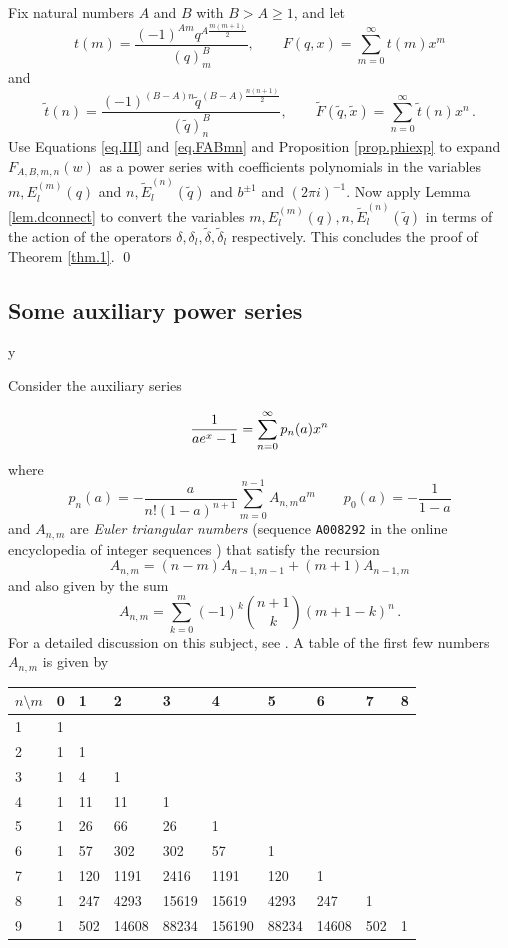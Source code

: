 \documentclass[12pt]{amsart}
\theoremstyle{definition}
\def\printname#1{
        \if\draft y
                \smash{\makebox[0pt]{\hspace{-0.5in}
                        \raisebox{8pt}{\tt\tiny #1}}}
        \fi
}
\def\lbl#1{\label{#1}\printname{#1}}
\def\ti{\widetilde}
\def\tq{\tilde{q}}
\def\d{\delta}
\begin{document}
Fix natural numbers $A$ and $B$ with $B > A \geq 1$, and  
let
$$
t(m)=\frac{(-1)^{A m} q^{A \frac{m(m+1)}{2}}}{(q)^B_m}, \qquad
F(q,x)=\sum_{m=0}^\infty t(m)x^m 
$$
and
$$
\ti t(n)=\frac{(-1)^{(B-A) n} \tq^{(B-A) \frac{n(n+1)}{2}}}{(\tq)^B_n}, 
\qquad
\ti F(\tq,\ti x)=\sum_{n=0}^\infty \ti t(n)x^n \,.
$$
Use Equations \eqref{eq.III} and \eqref{eq.FABmn} and Proposition 
\ref{prop.phiexp} to expand $F_{A,B,m,n}(w)$ as a power series with 
coefficients polynomials in the variables $m, E^{(m)}_l(q)$ and 
$n, \ti E^{(n)}_l(\tq)$ and $b^{\pm 1}$ and $(2 \pi i)^{-1}$. Now apply Lemma
\ref{lem.dconnect} to convert the variables $m, E^{(m)}_l(q),
n, \ti E^{(n)}_l(\tq)$ in terms of the action of the operators $\d,\d_l,\ti \d,
\ti \d_l$ respectively. This concludes the proof of Theorem \ref{thm.1}.
\qed

\subsection{Some auxiliary power series}
\lbl{sub.aux}

Consider the auxiliary series 

\begin{equation}
\lbl{eq.ax}
\frac{1}{a e^x-1}=\sum_{n=0}^\infty p_n(a) x^n
\end{equation}
where 
$$
p_n(a)=- \frac{a}{n! (1-a)^{n+1}} \sum_{m=0}^{n-1} A_{n,m} a^m
\qquad p_0(a)=-\frac{1}{1-a}
$$
and $A_{n,m}$ are {\em Euler triangular numbers} (sequence
{\tt A008292} in the online encyclopedia of integer sequences
\cite{OEIS}) that satisfy the recursion
$$
A_{n,m}=(n-m)A_{n-1,m-1}+(m+1)A_{n-1,m}
$$
and also given by the sum
$$
A_{n,m}=\sum_{k=0}^m (-1)^k \binom{n+1}{k} (m+1-k)^n \,.
$$
For a detailed discussion on this subject, see \cite{FS}.
A table of the first few numbers $A_{n,m}$ is given by

\begin{center}
\begin{tabular}{|l|l|l|l|l|l|l|l|l|l|} \hline
{$n\setminus m$} & 0 & 1 & 2 & 3 & 4 & 5 & 6 & 7 & 8  \\ \hline
1 &	1 &        &       &	&  & & & & \\ \hline
2 &	1 &	1  & & & & & & & \\ \hline
3 &	1 &	4  &	1 & & & & & & \\ \hline
4 &	1 &	11 &	11 &	1 & & & & & \\ \hline
5 &	1 &	26 &	66 &	26 &	1 & & & & \\ \hline
6 &	1 &	57 &	302 &	302 &	57 &	1 & & & \\ \hline
7 &	1 &	120 &	1191 &	2416 &	1191 & 	120 &	1 & & \\ \hline		
8 &	1 &	247 &	4293 &	15619 &	15619 &	4293 &	247 &	1 & \\ 
\hline		
9 &	1 &	502 &	14608 &	88234 &	156190 &88234 &	14608 &	502 & 1
\\ \hline
\end{tabular}
\end{center}
\end{document}

